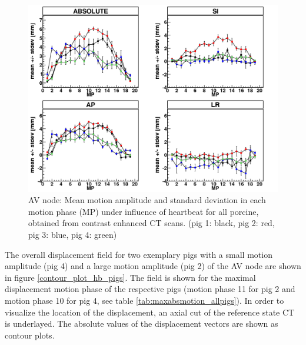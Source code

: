 \documentclass[type=dr, dr=rernat, accentcolor=tud7b,colorbacktitle, bigchapter, openright, twoside, 12pt ]{tudthesis}
\begin{document}
\vspace*{-0.4cm}

\begin{figure}[H]
\begin{center}
 \includegraphics[scale=0.22]{Mayo_AV_HB.png}
\caption{AV node: Mean motion amplitude and standard deviation in each motion phase (MP) under influence of heartbeat for all porcine, 
obtained from contrast enhanced CT scans. (pig 1: black, pig 2: red, pig 3: blue, pig 4: green) }
\label{fig:motion_hb_all_av}
\end{center}
\end{figure}

\newpage

The overall displacement field for two exemplary pigs with a small motion amplitude (pig 4) and a large motion amplitude (pig 2) of the 
AV node are shown in figure \ref{contour_plot_hb_pigs}. The field is shown for the maximal displacement motion phase of the respective pigs 
(motion phase 11 for pig 2 and motion phase 10 for pig 4, see table \ref{tab:maxabsmotion_allpigs}). 
In order to visualize the location of the displacement, an axial cut of the reference state CT is 
underlayed. The absolute values of the displacement vectors are shown as contour plots. 
\end{document}
